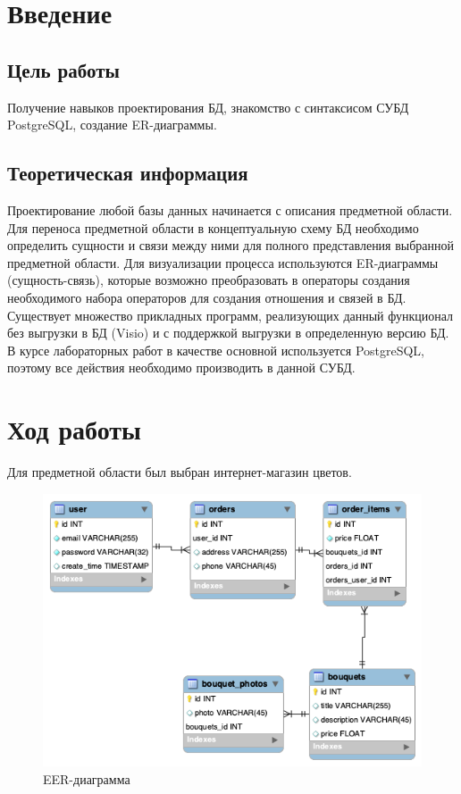 \chapter{Введение}

\section{Цель работы}

Получение навыков проектирования БД, знакомство с синтаксисом СУБД PostgreSQL, создание ER-диаграммы.

\section{Теоретическая информация}

Проектирование любой базы данных начинается с описания предметной области. Для переноса предметной области в концептуальную схему БД необходимо определить сущности и связи между ними для полного представления выбранной предметной области. Для визуализации процесса используются ER-диаграммы (сущность-связь), которые возможно преобразовать в операторы создания необходимого набора операторов для создания отношения и связей в БД. Существует множество прикладных программ, реализующих данный функционал без выгрузки в БД (Visio) и с поддержкой выгрузки в определенную версию БД.
В курсе лабораторных работ в качестве основной используется PostgreSQL, поэтому все действия необходимо производить в данной СУБД.

\chapter{Ход работы}


Для предметной области был выбран интернет-магазин цветов.

\begin{figure}[h!]
	\centering
	\caption{EER-диаграмма}
	\includegraphics[width=.9\textwidth]{images/EER.png}
\end{figure}












